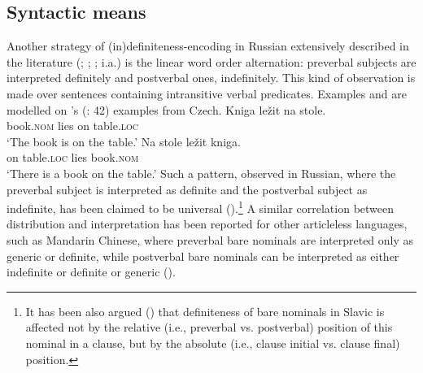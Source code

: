 \documentclass[output=paper,
colorlinks,
citecolor=brown,
newtxmath
]{langscibook}
\begin{document}
\subsection{Syntactic means}
Another strategy of (in)definiteness-encoding in Russian extensively described in the literature (\citealt{Pospelov1970}; \citealt{Fursenko1970}; \citealt{Chvany1973}; %
i.a.) is the linear word order alternation:
preverbal subjects are interpreted definitely and postverbal ones, indefinitely. This kind of observation is made over sentences containing intransitive verbal predicates. Examples  and  are modelled on \citeauthor{Kramsky1972}'s (\citeyear{Kramsky1972}: 42) examples from Czech.%
\ea
\ea \label{ex:9}
\gll Kniga			ležit	na	stole.\\
book.\textsc{nom} 	lies	on	table.\textsc{loc}\\
\glt `The book is on the table.'
\ex \label{ex:10}
\gll Na		stole			ležit	kniga.\\
on	table.\textsc{loc} 	lies	book.\textsc{nom}\\
\glt `There is a book on the table.'
\z \z
\noindent Such a pattern, observed in Russian, where the preverbal subject is interpreted as definite and the postverbal subject as indefinite, has been claimed to be universal (\citealt{Leiss2007}).\footnote{It has been also argued (\citealt{Simik.Burianova2020}) that definiteness of bare nominals in Slavic is affected not by the relative (i.e., preverbal vs. postverbal) position of this nominal in a clause, but by the absolute (i.e., clause initial vs. clause final) position.}  A similar correlation between distribution and interpretation has been reported for
other articleless languages,
such as Mandarin Chinese, where preverbal bare nominals are interpreted only as generic or definite,
while postverbal bare nominals can be interpreted as either indefinite or definite or generic (\citealt{Cheng.Sybesma2014}).
\end{document}
